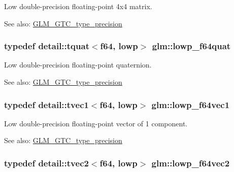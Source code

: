 Low double-precision floating-point 4x4 matrix. \begin{Desc}
\item[See also:]\hyperlink{group__gtc__type__precision}{GLM\_\-GTC\_\-type\_\-precision} \end{Desc}
\hypertarget{group__gtc__type__precision_g225e6f95dd6a7049b1a86db23b90cbac}{
\subsubsection[lowp\_\-f64quat]{\setlength{\rightskip}{0pt plus 5cm}typedef detail::tquat$<$f64, lowp$>$ {\bf glm::lowp\_\-f64quat}}}
\label{group__gtc__type__precision_g225e6f95dd6a7049b1a86db23b90cbac}


Low double-precision floating-point quaternion. \begin{Desc}
\item[See also:]\hyperlink{group__gtc__type__precision}{GLM\_\-GTC\_\-type\_\-precision} \end{Desc}
\hypertarget{group__gtc__type__precision_g47d9eed23b6e3fc58676176be392293a}{
\subsubsection[lowp\_\-f64vec1]{\setlength{\rightskip}{0pt plus 5cm}typedef detail::tvec1$<$f64, lowp$>$ {\bf glm::lowp\_\-f64vec1}}}
\label{group__gtc__type__precision_g47d9eed23b6e3fc58676176be392293a}


Low double-precision floating-point vector of 1 component. \begin{Desc}
\item[See also:]\hyperlink{group__gtc__type__precision}{GLM\_\-GTC\_\-type\_\-precision} \end{Desc}
\hypertarget{group__gtc__type__precision_gf2c6cba98bb2c2f1560d8edff4b70938}{
\subsubsection[lowp\_\-f64vec2]{\setlength{\rightskip}{0pt plus 5cm}typedef detail::tvec2$<$f64, lowp$>$ {\bf glm::lowp\_\-f64vec2}}}
\label{group__gtc__type__precision_gf2c6cba98bb2c2f1560d8edff4b70938}



